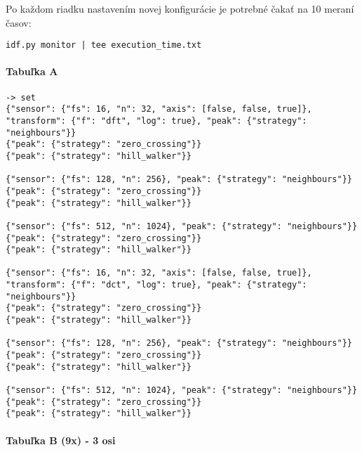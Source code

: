 Po každom riadku nastavením novej konfigurácie je potrebné čakať na 10 meraní časov: 
\begin{lstlisting}[style=messages]
idf.py monitor | tee execution_time.txt
\end{lstlisting}

\paragraph{Tabuľka A}

\begin{lstlisting}[style=messages]
-> set
{"sensor": {"fs": 16, "n": 32, "axis": [false, false, true]}, "transform": {"f": "dft", "log": true}, "peak": {"strategy": "neighbours"}}
{"peak": {"strategy": "zero_crossing"}}
{"peak": {"strategy": "hill_walker"}}

{"sensor": {"fs": 128, "n": 256}, "peak": {"strategy": "neighbours"}}
{"peak": {"strategy": "zero_crossing"}}
{"peak": {"strategy": "hill_walker"}}

{"sensor": {"fs": 512, "n": 1024}, "peak": {"strategy": "neighbours"}}
{"peak": {"strategy": "zero_crossing"}}
{"peak": {"strategy": "hill_walker"}}

{"sensor": {"fs": 16, "n": 32, "axis": [false, false, true]}, "transform": {"f": "dct", "log": true}, "peak": {"strategy": "neighbours"}}
{"peak": {"strategy": "zero_crossing"}}
{"peak": {"strategy": "hill_walker"}}

{"sensor": {"fs": 128, "n": 256}, "peak": {"strategy": "neighbours"}}
{"peak": {"strategy": "zero_crossing"}}
{"peak": {"strategy": "hill_walker"}}

{"sensor": {"fs": 512, "n": 1024}, "peak": {"strategy": "neighbours"}}
{"peak": {"strategy": "zero_crossing"}}
{"peak": {"strategy": "hill_walker"}}
\end{lstlisting}

\paragraph{Tabuľka B (9x) - 3 osi}

